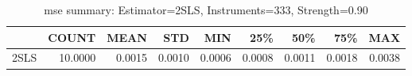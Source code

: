 \begin{table}[ht]
\centering
\caption{mse summary: Estimator=2SLS, Instruments=333, Strength=0.90}
\begin{tabular}{lrrrrrrrr}
\toprule
 & COUNT & MEAN & STD & MIN & 25\% & 50\% & 75\% & MAX \\
\midrule
2SLS & 10.0000 & 0.0015 & 0.0010 & 0.0006 & 0.0008 & 0.0011 & 0.0018 & 0.0038 \\
\bottomrule
\end{tabular}
\end{table}
